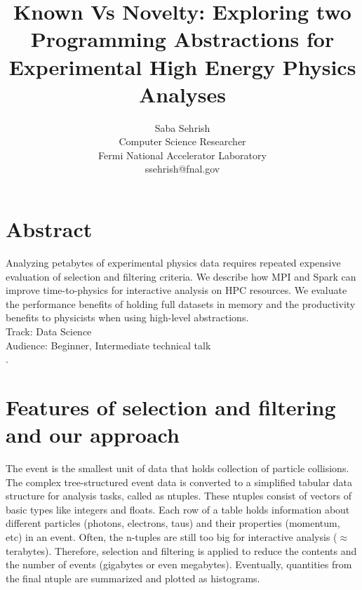 \documentclass[10pt, twocolumn]{article}
\newcommand{\squeezeup}{\vspace{-5.5mm}}
\begin{document}
\title{Known Vs Novelty: Exploring two Programming Abstractions for Experimental High Energy Physics Analyses}
\author{Saba Sehrish \\ Computer Science Researcher\\ Fermi National Accelerator Laboratory \\ ssehrish@fnal.gov}
\date{}
\maketitle

\thispagestyle{empty}

\section*{Abstract}
\squeezeup
Analyzing petabytes of experimental physics data requires repeated expensive evaluation of selection and filtering criteria. We describe how MPI and Spark can improve time-to-physics for interactive analysis on HPC resources. We evaluate the performance benefits of holding full datasets in memory and the productivity benefits to physicists when using high-level abstractions. 
\\
Track: Data Science  \\
Audience: Beginner, Intermediate technical talk \\
\squeezeup
. 
\squeezeup
\section{Features of selection and filtering and our approach}

The event is the smallest unit of data that holds collection of particle collisions. 
The complex tree-structured event data is converted to a simplified tabular data structure for analysis tasks, called as ntuples. 
These ntuples consist of vectors of basic types like integers and floats. 
Each row of a table holds information about different particles (photons, electrons, taus) and 
their properties (momentum, etc) in an event. Often, the n-tuples are still too big for interactive 
analysis ($\approx$ terabytes). 
Therefore, selection and filtering is applied to reduce the contents and the number of events 
(gigabytes or even megabytes). Eventually, quantities from the final ntuple are summarized 
and plotted as histograms. 
\end{document}
